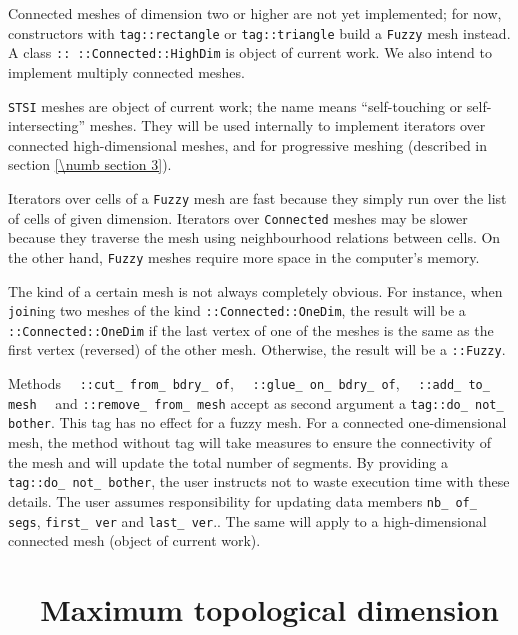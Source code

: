 Connected meshes of dimension two or higher are not yet implemented; for now,
{\small\tt{}} constructors with {\small\tt \textcolor{tag}{tag}::rectangle} or
{\small\tt \textcolor{tag}{tag}::triangle} build a {\small\tt Fuzzy} mesh instead.
A class {\small\tt{}:: ::Connected::HighDim} is object of current work.
We also intend to implement multiply connected meshes.

{\small\tt STSI} meshes are object of current work; the name means
``self-touching or self-intersecting'' meshes.
They will be used internally to implement iterators over connected high-dimensional meshes,
and for progressive meshing (described in section \ref{\numb section 3}).

Iterators over cells of a {\small\tt Fuzzy} mesh are fast because they simply run over the
list of cells of given dimension.
Iterators over {\small\tt Connected} meshes may be slower because they traverse the mesh using
neighbourhood relations between cells.
On the other hand, {\small\tt Fuzzy} meshes require more space in the computer's memory.

The kind of a certain mesh is not always completely obvious.
For instance, when {\small\tt join}ing two meshes of the kind
{\small\tt{}::Connected::OneDim}, the result will be a
{\small\tt{}::Connected::OneDim} if the last vertex of one of the meshes
is the same as the first vertex (reversed) of the other mesh.
Otherwise, the result will be a {\small\tt{}::Fuzzy}.

Methods \ \ {\small\tt{}::cut\_\,from\_\,bdry\_\,of},
\ \ {\small\tt{}::glue\_\,on\_\,bdry\_\,of}, \ \ {\small\tt{}::add\_\,to\_\,mesh}
\ \ and {\small\tt{}::remove\_\,from\_\,mesh}
accept as second argument a {\small\tt\textcolor{tag}{tag}::do\_\,not\_\,bother}.
This tag has no effect for a fuzzy mesh.
For a connected one-dimensional mesh, the method without tag will take measures
to ensure the connectivity of the mesh and will update the total number of segments.
By providing a {\small\tt\textcolor{tag}{tag}::do\_\,not\_\,bother}, the user instructs
{\maniFEM} not to waste execution time with these details.
The user assumes responsibility for updating data members {\small\tt nb\_\,of\_\,segs},
{\small\tt first\_\,ver} and {\small\tt last\_\,ver}..
The same will apply to a high-dimensional connected mesh (object of current work).


\section{~~Maximum topological dimension}\label{\numb section 11.\numb parag 7}

